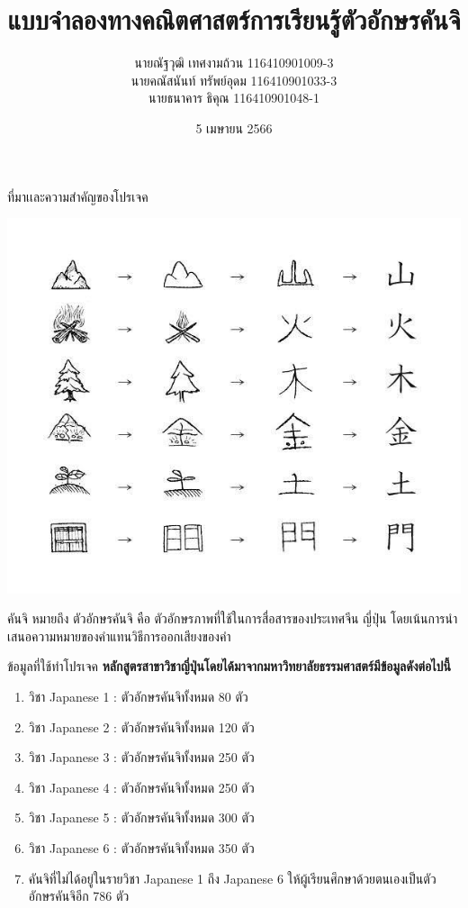 \documentclass{beamer}
\title{แบบจำลองทางคณิตศาสตร์การเรียนรู้ตัวอักษรคันจิ}
\author{นายณัฐวุฒิ เทศงามถ้วน 116410901009-3 \\ นายคณัสนันท์ ทรัพย์อุดม 116410901033-3 \\ นายธนาคาร ธิคุณ 116410901048-1}
\date{5 เมษายน 2566}
\begin{document}
\begin{frame}
\maketitle 
\end{frame}
\begin{frame}{ที่มาเเละความสำคัญของโปรเจค}
\begin{center}
\includegraphics[scale = 0.3]{1.jpg}
\end{center}
คันจิ หมายถึง ตัวอักษรคันจิ คือ ตัวอักษรภาพที่ใช้ในการสื่อสารของประเทศจีน ญี่ปุ่น โดยเน้นการนำเสนอความหมายของคำแทนวิธีการออกเสียงของคำ
\end{frame}

\begin{frame}{ข้อมูลที่ใช้ทำโปรเจค} 
\textbf{หลักสูตรสาขาวิชาญี่ปุ่นโดยได้มาจากมหาวิทยาลัยธรรมศาสตร์มีข้อมูลดังต่อไปนี้         }
\begin{enumerate}
	\item วิชา Japanese 1 : ตัวอักษรคันจิทั้งหมด 80 ตัว 
	\item วิชา Japanese 2 : ตัวอักษรคันจิทั้งหมด 120 ตัว
	\item วิชา Japanese 3 : ตัวอักษรคันจิทั้งหมด 250 ตัว	 
	\item วิชา Japanese 4 : ตัวอักษรคันจิทั้งหมด 250 ตัว 
	\item วิชา Japanese 5 : ตัวอักษรคันจิทั้งหมด 300 ตัว  
	\item วิชา Japanese 6 : ตัวอักษรคันจิทั้งหมด 350 ตัว  
	\item คันจิที่ไม่ได้อยู่ในรายวิชา Japanese 1 ถึง Japanese 6 ให้ผู้เรียนศึกษาด้วยตนเองเป็นตัวอักษรคันจิอีก 786 ตัว
\end{enumerate}
\end{frame}
\end{document}
